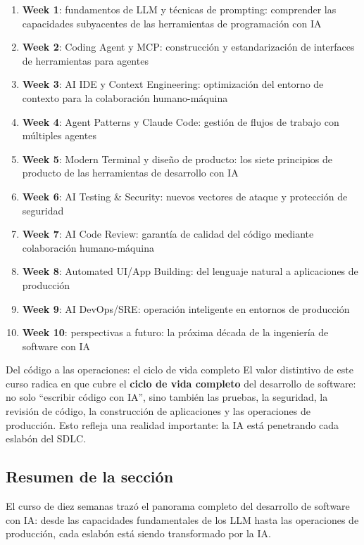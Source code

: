 \documentclass[a4paper]{article}
\begin{document}
\begin{enumerate}
    \item \textbf{Week 1}: fundamentos de LLM y técnicas de prompting: comprender las capacidades subyacentes de las herramientas de programación con IA
    \item \textbf{Week 2}: Coding Agent y MCP: construcción y estandarización de interfaces de herramientas para agentes
    \item \textbf{Week 3}: AI IDE y Context Engineering: optimización del entorno de contexto para la colaboración humano-máquina
    \item \textbf{Week 4}: Agent Patterns y Claude Code: gestión de flujos de trabajo con múltiples agentes
    \item \textbf{Week 5}: Modern Terminal y diseño de producto: los siete principios de producto de las herramientas de desarrollo con IA
    \item \textbf{Week 6}: AI Testing \& Security: nuevos vectores de ataque y protección de seguridad
    \item \textbf{Week 7}: AI Code Review: garantía de calidad del código mediante colaboración humano-máquina
    \item \textbf{Week 8}: Automated UI/App Building: del lenguaje natural a aplicaciones de producción
    \item \textbf{Week 9}: AI DevOps/SRE: operación inteligente en entornos de producción
    \item \textbf{Week 10}: perspectivas a futuro: la próxima década de la ingeniería de software con IA
\end{enumerate}

\begin{knowledgebox}{Del código a las operaciones: el ciclo de vida completo}
El valor distintivo de este curso radica en que cubre el \textbf{ciclo de vida completo} del desarrollo de software: no solo ``escribir código con IA'', sino también las pruebas, la seguridad, la revisión de código, la construcción de aplicaciones y las operaciones de producción. Esto refleja una realidad importante: la IA está penetrando cada eslabón del SDLC.
\end{knowledgebox}

\subsection{Resumen de la sección}

El curso de diez semanas trazó el panorama completo del desarrollo de software con IA: desde las capacidades fundamentales de los LLM hasta las operaciones de producción, cada eslabón está siendo transformado por la IA.
\end{document}
